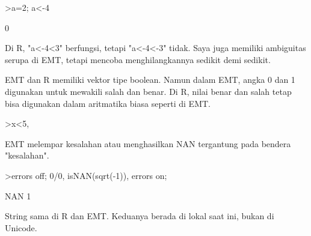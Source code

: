\documentclass[a4paper,10pt]{article}
\begin{document}
\begin{eulernotebook}
\begin{eulercomment}
\begin{eulercomment}
\begin{eulercomment}
\begin{eulercomment}
\begin{eulercomment}
\begin{eulercomment}
\begin{eulercomment}
\begin{eulercomment}
\begin{eulercomment}
\begin{eulercomment}
\begin{eulercomment}
\begin{eulercomment}
\begin{eulercomment}
\begin{eulercomment}
\begin{eulercomment}
\begin{eulercomment}
\begin{eulercomment}
\begin{eulercomment}
\begin{eulerprompt}
>a=2; a<-4
\end{eulerprompt}
\begin{euleroutput}
  0
\end{euleroutput}
\begin{eulercomment}
Di R, "a\textless{}-4\textless{}3" berfungsi, tetapi "a\textless{}-4\textless{}-3" tidak. Saya juga memiliki
ambiguitas serupa di EMT, tetapi mencoba menghilangkannya sedikit demi
sedikit.

EMT dan R memiliki vektor tipe boolean. Namun dalam EMT, angka 0 dan 1
digunakan untuk mewakili salah dan benar. Di R, nilai benar dan salah
tetap bisa digunakan dalam aritmatika biasa seperti di EMT.
\end{eulercomment}
\begin{eulerprompt}
>x<5, %
\end{eulerprompt}
\begin{euleroutput}
  [0,  0,  1,  0,  0]
  [0,  0,  3.1,  0,  0]
\end{euleroutput}
\begin{eulercomment}
EMT melempar kesalahan atau menghasilkan NAN tergantung pada bendera
"kesalahan".
\end{eulercomment}
\begin{eulerprompt}
>errors off; 0/0, isNAN(sqrt(-1)), errors on;
\end{eulerprompt}
\begin{euleroutput}
  NAN
  1
\end{euleroutput}
\begin{eulercomment}
String sama di R dan EMT. Keduanya berada di lokal saat ini, bukan di
Unicode.


\end{eulercomment}
\end{eulercomment}
\end{eulercomment}
\end{eulercomment}
\end{eulercomment}
\end{eulercomment}
\end{eulercomment}
\end{eulercomment}
\end{eulercomment}
\end{eulercomment}
\end{eulercomment}
\end{eulercomment}
\end{eulercomment}
\end{eulercomment}
\end{eulercomment}
\end{eulercomment}
\end{eulercomment}
\end{eulercomment}
\end{eulercomment}
\end{eulernotebook}
\end{document}
